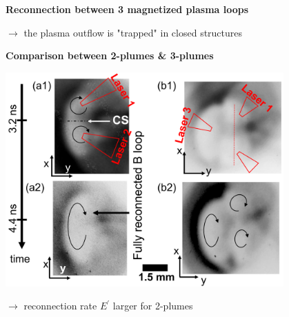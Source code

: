 \documentclass[landscape]{slides}
\begin{document}
\begin{slide}
{\large \textbf{Reconnection between 3 magnetized plasma loops}}

\begin{center}

\end{center}

$\to$ the plasma outflow is "trapped" in closed structures \\

\end{slide}



\begin{slide}
{\large \textbf{Comparison between 2-plumes \& 3-plumes}}

\begin{center}
\includegraphics[width=0.8\textwidth]{rcf_lmj.png}
\end{center}

$\to$ reconnection rate $E^{\prime}$ larger for 2-plumes\\

\end{slide}
\end{document}
